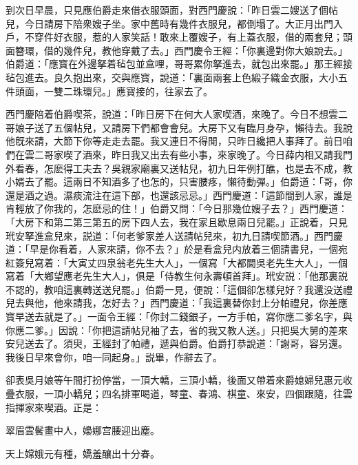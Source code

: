 到次日早晨，只見應伯爵走來借衣服頭面，對西門慶說：「昨日雲二嫂送了個帖兒，今日請房下陪衆嫂子坐。家中舊時有幾件衣服兒，都倒塌了。大正月出門入戶，不穿件好衣服，惹的人家笑話！敢來上覆嫂子，有上蓋衣服，借的兩套兒；頭面簪環，借的幾件兒，教他穿戴了去。」西門慶令王經：「你裏邊對你大娘說去。」伯爵道：「應寳在外邊拏着毡包並盒哩，哥哥累你拏進去，就包出來罷。」那王經接毡包進去。良久抱出來，交與應寳，說道：「裏面兩套上色緞子織金衣服，大小五件頭面，一雙二珠環兒。」應寳接的，往家去了。

西門慶陪着伯爵喫茶，說道：「昨日房下在何大人家喫酒，來晚了。今日不想雲二哥娘子送了五個帖兒，又請房下們都會會兒。大房下又有臨月身孕，懶待去。我說他旣來請，大節下你等走走去罷。我又連日不得閒，只昨日纔把人事拜了。前日咱們在雲二哥家喫了酒來，昨日我又出去有些小事，來家晚了。今日薛内相又請我門外看春，怎麽得工夫去？吳親家廟裏又送帖兒，初九日年例打醮，也是去不成，教小婿去了罷。這兩日不知酒多了也怎的，只害腰疼，懶待動彈。」伯爵道：「哥，你還是酒之過。濕痰流注在這下部，也還該忌忌。」西門慶道：「這節間到人家，誰是肯輕放了你我的，怎麽忌的住！」伯爵又問：「今日那幾位嫂子去？」西門慶道：「大房下和第二第三第五的房下四人去，我在家且歇息兩日兒罷。」正說着，只見玳安拏進盒兒來，説道：「何老爹家差人送請帖兒來，初九日請喫節酒。」西門慶道：「早是你看着，人家來請，你不去？」於是看盒兒内放着三個請書兒，一個宛紅簽兒寫着：「大寅丈四泉翁老先生大人」，一個寫「大都閫吳老先生大人」，一個寫着「大鄉望應老先生大人」，俱是「侍教生何永壽頓首拜」。玳安説：「他那裏説不認的，教咱這裏轉送送兒罷。」伯爵一見，便說：「這個卻怎樣兒好？我還没送禮兒去與他，他來請我，怎好去？」西門慶道：「我這裏替你封上分帕禮兒，你差應寳早送去就是了。」一面令王經：「你封二錢銀子，一方手帕，寫你應二爹名字，與你應二爹。」因說：「你把這請帖兒袖了去，省的我又教人送。」只把吳大舅的差來安兒送去了。須臾，王經封了帕禮，遞與伯爵。伯爵打恭說道：「謝哥，容另還。我後日早來會你，咱一同起身。」説畢，作辭去了。

卻表吳月娘等午間打扮停當，一頂大轎，三頂小轎，後面又帶着來爵媳婦兒惠元收疊衣服，一頂小轎兒；四名排軍喝道，琴童、春鴻、棋童、來安，四個跟隨，往雲指揮家來喫酒。正是：　

\begin{myquote}
翠眉雲鬢畫中人，嬝娜宫腰迎出塵。

天上嫦娥元有種，嬌羞釀出十分春。
\end{myquote}

